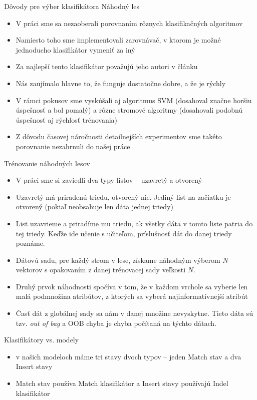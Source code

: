 \documentclass[xcolor=dvipsnames, compress, 12pt]{beamer}
\theoremstyle{definition}
\begin{document}
\begin{frame}{Dôvody pre výber klasifikátora Náhodný les}
\begin{itemize}
  \item V práci sme sa nezaoberali porovnaním rôznych klasifikačných algoritmov
  \item Namiesto toho sme implementovali zarovnávač, v ktorom je možné jednoducho klasifikátor vymeniť za iný
  \item Za najlepší tento klasifikátor považujú jeho autori v článku \cite{randomForestPaper}
  \item Nás zaujímalo hlavne to, že funguje dostatočne dobre, a že je rýchly
  \item V rámci pokusov sme vyskúšali aj algoritmus SVM (dosahoval značne horšiu úspešnosť a bol pomalý) a rôzne stromové algoritmy (dosahovali podobnú úspešnosť aj rýchlosť trénovania)
  \item Z dôvodu časovej náročnosti detailnejších experimentov sme takéto porovnanie nezahrnuli do našej práce
\end{itemize}
\end{frame}

\begin{frame}{Trénovanie náhodných lesov}
\begin{itemize}
  \item V práci sme si zaviedli dva typy listov -- uzavretý a otvorený
  \item Uzavretý má priradenú triedu, otvorený nie. Jediný list na začiatku je otvorený (pokiaľ neobsahuje len dáta jednej triedy)
  \item List uzavrieme a priradíme mu triedu, ak všetky dáta v tomto liste patria do tej triedy. Keďže ide učenie s učiteľom, príslušnosť dát do danej triedy poznáme.
  \item Dátovú sadu, pre každý strom v lese, získame náhodným výberom $N$ vektorov s opakovaním z danej trénovacej sady veľkosti $N$.
  \item Druhý prvok náhodnosti spočíva v tom, že v každom vrchole sa vyberie len malá podmnožina atribútov, z ktorých sa vyberá najinformatívnejší atribút
  \item Časť dát z globálnej sady sa nám v danej množine nevyskytne. Tieto dáta sú tzv. \textit{out of bag} a OOB chyba je chyba počítaná na týchto dátach.
\end{itemize}
\end{frame}


\begin{frame}{Klasifikátory vs. modely}
\begin{itemize}
  \item v našich modeloch máme tri stavy dvoch typov -- jeden Match stav a dva Insert stavy
  \item Match stav používa Match klasifikátor a Insert stavy používajú Indel klasifikátor
\end{itemize}
\end{frame}
\end{document}
